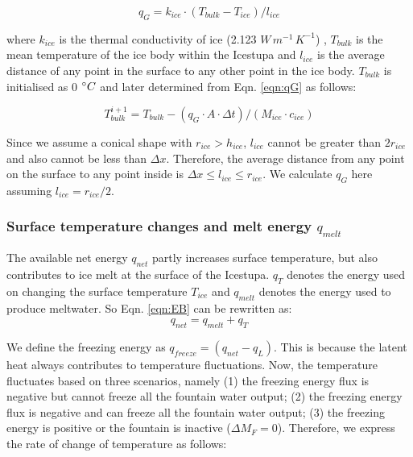 \documentclass[utf8]{frontiersSCNS} %
\begin{document}
\begin{equation} q_{G} = k_{ice} \cdot (T_{bulk}-T_{ice})/l_{ice} \label{eqn:qG}    \end{equation}

where $k_{ice}$ is the thermal conductivity of ice (2.123 $W\, m^{-1}\,K^{-1}$) , $T_{bulk}$ is the mean temperature of
the ice body within the Icestupa and $l_{ice}$ is the average distance of any point in the surface to any other point
in the ice body. $T_{bulk}$ is initialised as 0 $\degree C$ and later determined from Eqn. \ref{eqn:qG} as follows:

\begin{equation} T_{bulk}^{i+1} = T_{bulk} - (q_{G} \cdot A \cdot \Delta t)/(M_{ice} \cdot c_{ice}) \end{equation}

Since we assume a conical shape with $r_{ice} > h_{ice}$, $l_{ice}$ cannot be greater than $2r_{ice}$ and also cannot
be less than $\Delta x$. Therefore, the average distance from any point on the surface to any point inside is $\Delta
x \leq l_{ice} \leq r_{ice}$. We calculate $q_{G}$ here assuming $l_{ice} = r_{ice}/2$.

\subsubsection{Surface temperature changes and melt energy \texorpdfstring{$q_{melt}$}{Lg}}
The available net energy $q_{net}$ partly increases surface temperature, but also contributes to ice melt at the
surface of the Icestupa. $q_{T}$ denotes the energy used on changing the surface temperature $T_{ice}$ and $q_{melt}$
denotes the energy used to produce meltwater. So Eqn. \ref{eqn:EB} can be rewritten as: \begin{equation} q_{net} =
q_{melt} + q_{T} \end{equation}

We define the freezing energy as $q_{freeze} = (q_{net}-q_{L})$. This is because the latent heat always contributes to
temperature fluctuations. Now, the temperature fluctuates based on three scenarios, namely (1) the freezing energy flux
is negative but cannot freeze all the fountain water output; (2) the freezing energy flux is negative and can freeze
all the fountain water output; (3) the freezing energy is positive or the fountain is inactive ($\Delta M_{F}=0$).
Therefore, we express the rate of change of temperature as follows:
\end{document}
